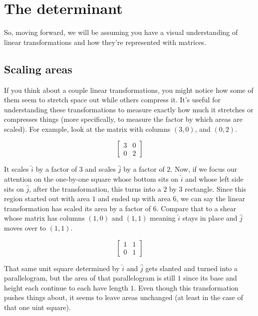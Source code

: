 \section{The determinant}

So, moving forward, we will be assuming you have a visual understanding of
linear transformations and how they're represented with matrices.

\subsection{Scaling areas}

If you think about a couple linear transformations, you might notice how some of
them seem to stretch space out while others compress it. It's useful for
understanding these transformations to measure exactly how much it stretches or
compresses things (more specifically, to measure the factor by which areas are
scaled). For example, look at the matrix with columns $(3, 0)$, and $(0, 2)$.

\begin{equation*}
  \begin{bmatrix}
    3 & 0 \\
    0 & 2
  \end{bmatrix}
\end{equation*}

It scales $\hat{i}$ by a factor of $3$ and scales $\hat{j}$ by a factor of $2$.
Now, if we focus our attention on the one-by-one square whose bottom sits on
$\hat{i}$ and whose left side sits on $\hat{j}$, after the transformation, this
turns into a $2$ by $3$ rectangle. Since this region started out with area $1$
and ended up with area $6$, we can say the linear transformation has scaled its
area by a factor of $6$. Compare that to a shear whose matrix has columns
$(1, 0)$ and $(1, 1)$ meaning $\hat{i}$ stays in place and $\hat{j}$ moves over
to $(1, 1)$.

\begin{equation*}
  \begin{bmatrix}
    1 & 1 \\
    0 & 1
  \end{bmatrix}
\end{equation*}

That same unit square determined by $\hat{i}$ and $\hat{j}$ gets slanted and
turned into a parallelogram, but the area of that parallelogram is still $1$
since its base and height each continue to each have length $1$. Even though
this transformation pushes things about, it seems to leave areas unchanged (at
least in the case of that one uint square).

